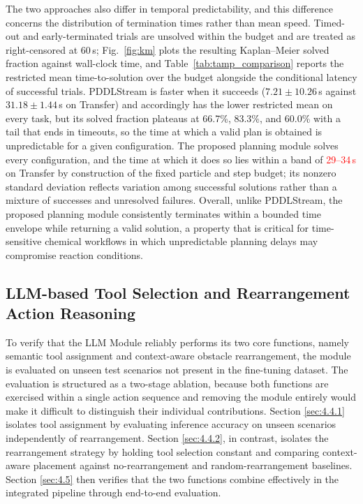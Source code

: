 \documentclass{ieeeaccess}
\newif\ifhighlight
\newcommand{\rev}[1]{\ifhighlight\hl{#1}\else#1\fi}
\newcommand{\nd}[1]{\textcolor{red}{#1}}
\begin{document}
The two approaches also differ in temporal predictability\rev{, and this difference concerns the distribution of termination times rather than mean speed}.
\rev{Timed-out and early-terminated trials are unsolved within the budget and are treated as right-censored at 60\,s; Fig.~\ref{fig:km} plots the resulting Kaplan--Meier solved fraction against wall-clock time, and Table~\ref{tab:tamp_comparison} reports the restricted mean time-to-solution over the budget alongside the conditional latency of successful trials.
PDDLStream is faster when it succeeds ($7.21 \pm 10.26$\,s against $31.18 \pm 1.44$\,s on Transfer) and accordingly has the lower restricted mean on every task, but its solved fraction plateaus at 66.7\%, 83.3\%, and 60.0\% with a tail that ends in timeouts, so the time at which a valid plan is obtained is unpredictable for a given configuration.
The proposed planning module solves every configuration, and the time at which it does so lies within a band of \nd{29--34\,s} on Transfer by construction of the fixed particle and step budget; its nonzero standard deviation reflects variation among successful solutions rather than a mixture of successes and unresolved failures.}
Overall, unlike PDDLStream, the proposed planning module consistently terminates within a bounded time envelope while returning a valid solution, a property that is critical for time-sensitive chemical workflows in which unpredictable planning delays may compromise reaction conditions.



\subsection{LLM-based Tool Selection and Rearrangement Action Reasoning}\label{sec:4.4}
To verify that the LLM Module reliably performs its two core functions, namely semantic tool assignment and context-aware obstacle rearrangement, the module is evaluated on unseen test scenarios not present in the fine-tuning dataset. The evaluation is structured as a two-stage ablation, because both functions are exercised within a single action sequence and removing the module entirely would make it difficult to distinguish their individual contributions. Section \ref{sec:4.4.1} isolates tool assignment by evaluating inference accuracy on unseen scenarios independently of rearrangement. Section \ref{sec:4.4.2}, in contrast, isolates the rearrangement strategy by holding tool selection constant and comparing context-aware placement against no-rearrangement and random-rearrangement baselines. Section \ref{sec:4.5} then verifies that the two functions combine effectively in the integrated pipeline through end-to-end evaluation.
\end{document}
